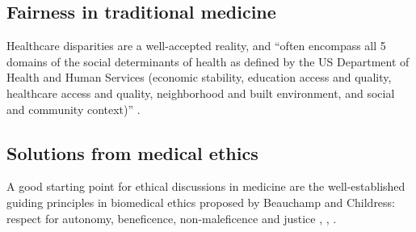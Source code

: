 \subsection{Fairness in traditional medicine}
Healthcare disparities are a well-accepted reality, and ``often encompass all 5 domains of the social determinants of health as defined by the US Department of Health and Human Services (economic stability, education access and quality, healthcare access and quality, neighborhood and built environment, and social and community context)'' \cite[p.~2]{Chen2021}.


\subsection{Solutions from medical ethics}
A good starting point for ethical discussions in medicine are the well-established guiding principles in biomedical ethics proposed by Beauchamp and Childress: respect for autonomy, beneficence, non-maleficence and justice \cite[pp.~344-345]{Dijkstra2020}, \cite[p.~2]{Morley2020}, \cite[p.~2]{Rajkomar2018}.


